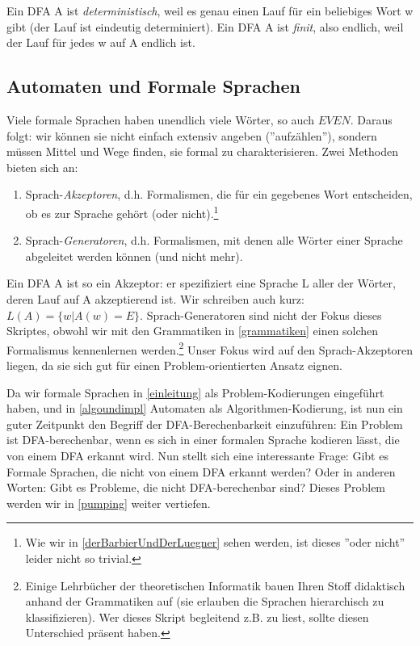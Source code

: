 Ein DFA A ist \emph{deterministisch}, weil es genau einen Lauf
für ein beliebiges Wort w gibt (der Lauf ist eindeutig determiniert).
Ein DFA A ist \emph{finit}, also endlich, weil der Lauf für jedes w auf A endlich ist.

\subsection{Automaten und Formale Sprachen}

Viele formale Sprachen haben unendlich viele Wörter,
so auch $EVEN$.
Daraus folgt: wir können sie nicht einfach extensiv angeben (''aufzählen''),
sondern müssen Mittel und Wege finden, sie formal zu charakterisieren.
Zwei Methoden bieten sich an:
\begin{enumerate}
    \item Sprach-\emph{Akzeptoren}, d.h. Formalismen,
        die für ein gegebenes Wort entscheiden,
        ob es zur Sprache gehört (oder nicht).\footnote{
            Wie wir in \autoref{derBarbierUndDerLuegner} sehen werden,
            ist dieses ''oder nicht'' leider nicht so trivial.}

    \item Sprach-\emph{Generatoren}, d.h. Formalismen,
        mit denen alle Wörter einer Sprache abgeleitet werden können
        (und nicht mehr).
\end{enumerate}


Ein DFA A ist so ein Akzeptor:
er spezifiziert eine Sprache L aller der Wörter,
deren Lauf auf A akzeptierend ist.
Wir schreiben auch kurz: $L(A) = \{w|A(w) = E\}$.
Sprach-Generatoren sind nicht der Fokus dieses Skriptes, obwohl wir mit den Grammatiken
in \autoref{grammatiken} einen solchen Formalismus kennenlernen werden.\footnote{
Einige Lehrbücher der theoretischen Informatik bauen Ihren Stoff didaktisch anhand der Grammatiken
auf (sie erlauben die Sprachen hierarchisch zu klassifizieren).
Wer dieses Skript begleitend z.B. zu \cite{schoening} liest,
sollte diesen Unterschied präsent haben.}
Unser Fokus wird auf den Sprach-Akzeptoren liegen,
da sie sich gut für einen Problem-orientierten Ansatz eignen.

Da wir formale Sprachen in \autoref{einleitung} als Problem-Kodierungen eingeführt haben,
und in \autoref{algoundimpl} Automaten als Algorithmen-Kodierung,
ist nun ein guter Zeitpunkt den Begriff der DFA-Berechenbarkeit einzuführen:
Ein Problem ist DFA-berechenbar,
wenn es sich in einer formalen Sprache kodieren lässt,
die von einem DFA erkannt wird.
Nun stellt sich eine interessante Frage:
Gibt es Formale Sprachen, die nicht von einem DFA erkannt werden?
Oder in anderen Worten: Gibt es Probleme, die nicht DFA-berechenbar sind?
Dieses Problem werden wir in \autoref{pumping} weiter vertiefen.

